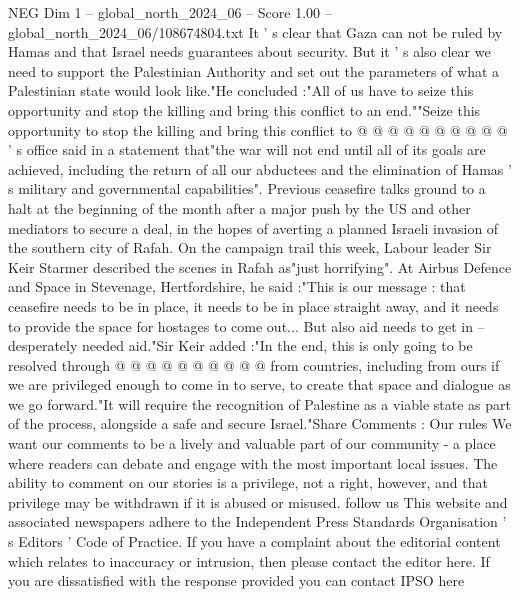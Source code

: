 \begin{textsample}{NEG Dim 1 – global\_north\_2024\_06 – Score 1.00 – global\_north\_2024\_06/108674804.txt}
It ' s clear that Gaza can not be ruled by Hamas and that Israel needs guarantees about security.
But it ' s also clear we need to support the Palestinian Authority and set out the parameters of what a Palestinian state would look like."He concluded :"All of us have to seize this opportunity and stop the killing and bring this conflict to an end.""Seize this opportunity to stop the killing and bring this conflict to @ @ @ @ @ @ @ @ @ @ ' s office said in a statement that"the war will not end until all of its goals are achieved, including the return of all our abductees and the elimination of Hamas ' s military and governmental capabilities".
Previous ceasefire talks ground to a halt at the beginning of the month after a major push by the US and other mediators to secure a deal, in the hopes of averting a planned Israeli invasion of the southern city of Rafah.
On the campaign trail this week, Labour leader Sir Keir Starmer described the scenes in Rafah as"just horrifying".
At Airbus Defence and Space in Stevenage, Hertfordshire, he said :"This is our message : that ceasefire needs to be in place, it needs to be in place straight away, and it needs to provide the space for hostages to come out...
But also aid needs to get in -- desperately needed aid."Sir Keir added :"In the end, this is only going to be resolved through @ @ @ @ @ @ @ @ @ @ from countries, including from ours if we are privileged enough to come in to serve, to create that space and dialogue as we go forward."It will require the recognition of Palestine as a viable state as part of the process, alongside a safe and secure Israel."Share Comments : Our rules We want our comments to be a lively and valuable part of our community - a place where readers can debate and engage with the most important local issues.
The ability to comment on our stories is a privilege, not a right, however, and that privilege may be withdrawn if it is abused or misused. follow us This website and associated newspapers adhere to the Independent Press Standards Organisation ' s Editors ' Code of Practice.
If you have a complaint about the editorial content which relates to inaccuracy or intrusion, then please contact the editor here.
If you are dissatisfied with the response provided you can contact IPSO here

\end{textsample}
